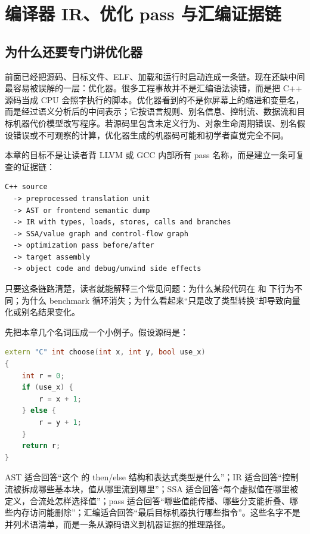\chapter{编译器 IR、优化 pass 与汇编证据链}

\section{为什么还要专门讲优化器}

前面已经把源码、目标文件、ELF、加载和运行时启动连成一条链。现在还缺中间最容易被误解的一层：优化器。很多工程事故并不是汇编语法读错，而是把 C++ 源码当成 CPU 会照字执行的脚本。优化器看到的不是你屏幕上的缩进和变量名，而是经过语义分析后的中间表示；它按语言规则、别名信息、控制流、数据流和目标机器代价模型改写程序。若源码里包含未定义行为、对象生命周期错误、别名假设错误或不可观察的计算，优化器生成的机器码可能和初学者直觉完全不同。

本章的目标不是让读者背 LLVM 或 GCC 内部所有 pass 名称，而是建立一条可复查的证据链：

\begin{lstlisting}[numbers=none,caption={优化器证据链}]
C++ source
  -> preprocessed translation unit
  -> AST or frontend semantic dump
  -> IR with types, loads, stores, calls and branches
  -> SSA/value graph and control-flow graph
  -> optimization pass before/after
  -> target assembly
  -> object code and debug/unwind side effects
\end{lstlisting}

只要这条链路清楚，读者就能解释三个常见问题：为什么某段代码在  和  下行为不同；为什么 benchmark 循环消失；为什么看起来“只是改了类型转换”却导致向量化或别名结果变化。

先把本章几个名词压成一个小例子。假设源码是：

\begin{lstlisting}[language=C++,caption={贯穿优化器章节的最小分支}]
extern "C" int choose(int x, int y, bool use_x)
{
    int r = 0;
    if (use_x) {
        r = x + 1;
    } else {
        r = y + 1;
    }
    return r;
}
\end{lstlisting}

AST 适合回答“这个  的 then/else 结构和表达式类型是什么”；IR 适合回答“控制流被拆成哪些基本块，值从哪里流到哪里”；SSA 适合回答“每个虚拟值在哪里被定义，合流处怎样选择值”；pass 适合回答“哪些值能传播、哪些分支能折叠、哪些内存访问能删除”；汇编适合回答“最后目标机器执行哪些指令”。这些名字不是并列术语清单，而是一条从源码语义到机器证据的推理路径。

